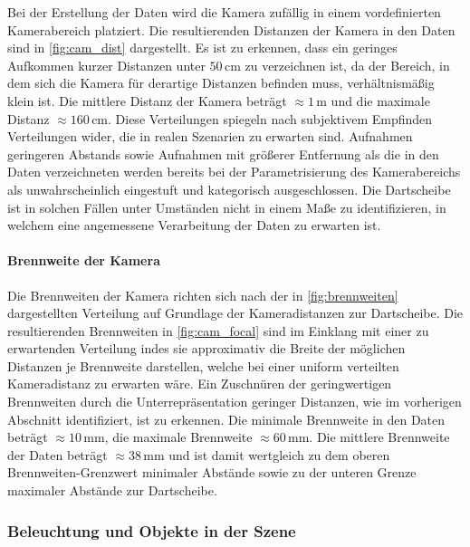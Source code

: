 Bei der Erstellung der Daten wird die Kamera zufällig in einem vordefinierten Kamerabereich platziert. Die resultierenden Distanzen der Kamera in den Daten sind in \autoref{fig:cam_dist} dargestellt. Es ist zu erkennen, dass ein geringes Aufkommen kurzer Distanzen unter $50\,\text{cm}$ zu verzeichnen ist, da der Bereich, in dem sich die Kamera für derartige Distanzen befinden muss, verhältnismäßig klein ist. Die mittlere Distanz der Kamera beträgt $\approx1\,\text{m}$ und die maximale Distanz $\approx160\,\text{cm}$. Diese Verteilungen spiegeln nach subjektivem Empfinden Verteilungen wider, die in realen Szenarien zu erwarten sind. Aufnahmen geringeren Abstands sowie Aufnahmen mit größerer Entfernung als die in den Daten verzeichneten werden bereits bei der Parametrisierung des Kamerabereichs als unwahrscheinlich eingestuft und kategorisch ausgeschlossen. Die Dartscheibe ist in solchen Fällen unter Umständen nicht in einem Maße zu identifizieren, in welchem eine angemessene Verarbeitung der Daten zu erwarten ist.

\paragraph{Brennweite der Kamera}

Die Brennweiten der Kamera richten sich nach der in \autoref{fig:brennweiten} dargestellten Verteilung auf Grundlage der Kameradistanzen zur Dartscheibe. Die resultierenden Brennweiten in \autoref{fig:cam_focal} sind im Einklang mit einer zu erwartenden Verteilung indes sie approximativ die Breite der möglichen Distanzen je Brennweite darstellen, welche bei einer uniform verteilten Kameradistanz zu erwarten wäre. Ein Zuschnüren der geringwertigen Brennweiten durch die Unterrepräsentation geringer Distanzen, wie im vorherigen Abschnitt identifiziert, ist zu erkennen. Die minimale Brennweite in den Daten beträgt $\approx10\,\text{mm}$, die maximale Brennweite $\approx60\,\text{mm}$. Die mittlere Brennweite der Daten beträgt $\approx38\,\text{mm}$ und ist damit wertgleich zu dem oberen Brennweiten-Grenzwert minimaler Abstände sowie zu der unteren Grenze maximaler Abstände zur Dartscheibe.

\subsubsection{Beleuchtung und Objekte in der Szene}
\label{sec:beleuchtung_ergebnisse}

